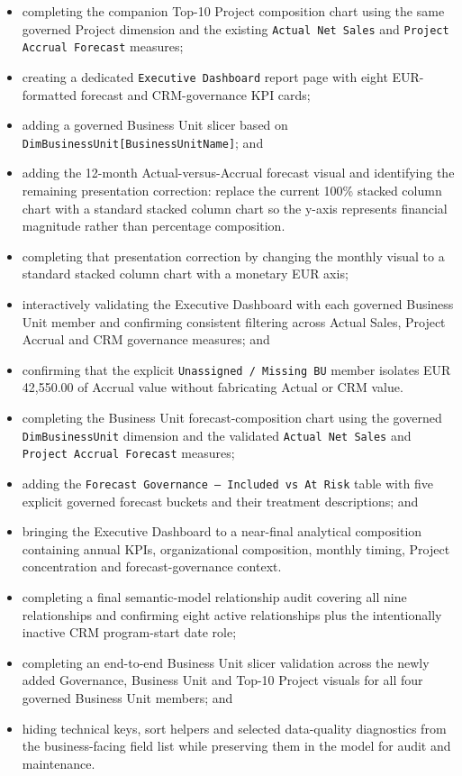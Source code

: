 \documentclass[11pt,a4paper]{article}
\begin{document}
\begin{itemize}[leftmargin=7mm,itemsep=3pt]
    \item completing the companion Top-10 Project composition chart using the same
    governed Project dimension and the existing \texttt{Actual Net Sales} and
    \texttt{Project Accrual Forecast} measures;
    \item creating a dedicated \texttt{Executive Dashboard} report page with eight
    EUR-formatted forecast and CRM-governance KPI cards;
    \item adding a governed Business Unit slicer based on
    \texttt{DimBusinessUnit[BusinessUnitName]}; and
    \item adding the 12-month Actual-versus-Accrual forecast visual and identifying
    the remaining presentation correction: replace the current 100\% stacked column
    chart with a standard stacked column chart so the y-axis represents financial
    magnitude rather than percentage composition.
    \item completing that presentation correction by changing the monthly visual to
    a standard stacked column chart with a monetary EUR axis;
    \item interactively validating the Executive Dashboard with each governed
    Business Unit member and confirming consistent filtering across Actual Sales,
    Project Accrual and CRM governance measures; and
    \item confirming that the explicit \texttt{Unassigned / Missing BU} member
    isolates EUR 42,550.00 of Accrual value without fabricating Actual or CRM value.

    \item completing the Business Unit forecast-composition chart using the governed
    \texttt{DimBusinessUnit} dimension and the validated \texttt{Actual Net Sales}
    and \texttt{Project Accrual Forecast} measures;
    \item adding the \texttt{Forecast Governance -- Included vs At Risk} table with
    five explicit governed forecast buckets and their treatment descriptions; and
    \item bringing the Executive Dashboard to a near-final analytical composition
    containing annual KPIs, organizational composition, monthly timing, Project
    concentration and forecast-governance context.
    \item completing a final semantic-model relationship audit covering all nine
    relationships and confirming eight active relationships plus the intentionally
    inactive CRM program-start date role;
    \item completing an end-to-end Business Unit slicer validation across the newly
    added Governance, Business Unit and Top-10 Project visuals for all four governed
    Business Unit members; and
    \item hiding technical keys, sort helpers and selected data-quality diagnostics
    from the business-facing field list while preserving them in the model for audit
    and maintenance.
\end{itemize}
\end{document}
